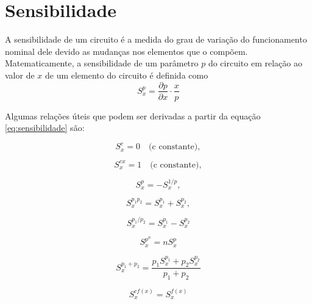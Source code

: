 
\chapter{Sensibilidade}
\label{chap: sensibilidade}

A sensibilidade de um circuito é a medida do grau de variação do funcionamento nominal dele devido as mudanças nos elementos que o compõem. Matematicamente, a sensibilidade de um parâmetro $p$ do circuito em relação ao valor de $x$ de um elemento do circuito é definida como
\begin{equation}
    S^p_{x} = \frac{\partial p}{\partial x} \cdot \frac{x}{p}   
    \label{eq:sensibilidade}
\end{equation}

Algumas relações úteis que podem ser derivadas a partir da equação \ref{eq:sensibilidade} são:

\begin{equation}
    S^c_{x} = 0 \quad \text{(c constante)},
\end{equation}

\begin{equation}
    S^{c x} _{x} = 1 \quad \text{(c constante)},
    \label{eq:constante2}
\end{equation}

\begin{equation}
    S^p_{x} = - S^{1/p}_{x},
    \label{eq:inversa}
\end{equation}

\begin{equation}
    S^{p_1 p_2}_{x} = S^{p_1}_{x} + S^{p_2}_{x},
\end{equation}

\begin{equation}
    S^{p_1 / p_2}_{x} = S^{p_1}_{x} - S^{p_2}_{x}
    \label{eq:divisao}
\end{equation}

\begin{equation}
    S^{p^n}_{x} =  nS^{p}_{x}
    \label{eq:potencia}
\end{equation}

\begin{equation}
    S^{p_1 + p_2}_{x} = \frac{p_1 S^{p_1}_{x} + p_2 S^{p_2}_{x}}{p_1 + p_2}
\end{equation}

\begin{equation}
    S^{cf(x)}_{x} = S^{f(x)}_x
    \label{eq:constante}
\end{equation}

